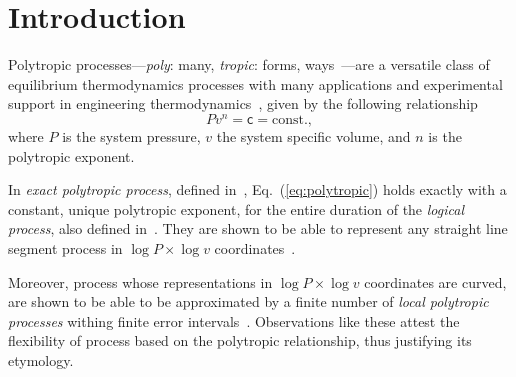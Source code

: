 \section{Introduction}

    Polytropic        processes---\emph{poly}:        many,        \emph{tropic}:         forms,
    ways~\cite{2020-NaaktgeborenC-engrXiv}---are a versatile class of equilibrium thermodynamics
    processes   with   many   applications   and    experimental    support    in    engineering
    thermodynamics~\cite{2002-MoranMJ+ShapiroHN-LTC,                 2013-CengelYA+BolesMA-AMGH,
    2015-KroosKA+PotterMC-Cengage,  1986-JonesJB+HawkinsGA-Wiley},  given   by   the   following
    relationship
    \begin{equation}
        Pv^n = \mathsf{c} = \mbox{const.},
        \label{eq:polytropic}
    \end{equation}
    \noindent where $P$ is the system pressure, $v$ the system specific volume, and $n$  is  the
    polytropic exponent.

    In   \emph{exact   polytropic   process},   defined    in~\cite{2020-NaaktgeborenC-engrXiv},
    Eq.~(\ref{eq:polytropic}) holds exactly with a constant, unique polytropic exponent, for the
    entire     duration     of      the      \emph{logical      process},      also      defined
    in~\cite{2020-NaaktgeborenC-engrXiv}. They are shown to be able to  represent  any  straight
    line      segment      process       in       $\log       P       \times       \log       v$
    coordinates~\cite{2020-NaaktgeborenC-engrXiv}.

    Moreover, process whose representations in $\log P \times \log v$  coordinates  are  curved,
    are shown to be able to be  approximated  by  a  finite  number  of  \emph{local  polytropic
    processes} withing finite  error  intervals~\cite{2020-NaaktgeborenC-engrXiv}.  Observations
    like these attest the flexibility of process based  on  the  polytropic  relationship,  thus
    justifying its etymology.




